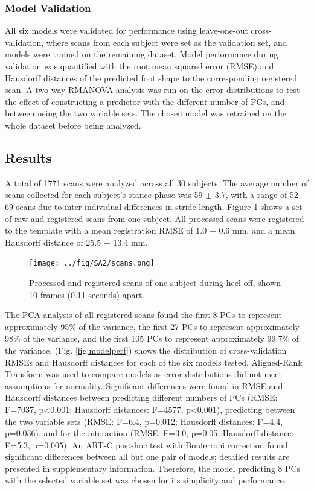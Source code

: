 \documentclass[defaultstyle,11pt]{comps}
\begin{document}
\hypertarget{model-validation}{%
\subsubsection{Model Validation}\label{model-validation}}

All six models were validated for performance using leave-one-out cross-validation, where scans from each subject were set as the validation set, and models were trained on the remaining dataset.
Model performance during validation was quantified with the root mean squared error (RMSE) and Hausdorff distances of the predicted foot shape to the corresponding registered scan.
A two-way RMANOVA analysis was run on the error distributions to test the effect of constructing a predictor with the different number of PCs, and between using the two variable sets.
The chosen model was retrained on the whole dataset before being analyzed.

\hypertarget{results-1}{%
\subsection{Results}\label{results-1}}

A total of 1771 scans were analyzed across all 30 subjects.
The average number of scans collected for each subject's stance phase was 59 \(\pm\) 3.7, with a range of 52-69 scans due to inter-individual differences in stride length.
Figure \ref{fig:scans} shows a set of raw and registered scans from one subject.
All processed scans were registered to the template with a mean registration RMSE of 1.0 \(\pm\) 0.6 mm, and a mean Hausdorff distance of 25.5 \(\pm\) 13.4 mm.

\begin{figure}
\hypertarget{fig:scans}{%
\centering
\texttt{[image: ../fig/SA2/scans.png]}
\caption{Processed and registered scans of one subject during heel-off, shown 10 frames (0.11 seconds) apart.}\label{fig:scans}
}
\end{figure}

The PCA analysis of all registered scans found the first 8 PCs to represent approximately 95\% of the variance, the first 27 PCs to represent approximately 98\% of the variance, and the first 105 PCs to represent approximately 99.7\% of the variance.
(Fig. \ref{fig:modelperf}) shows the distribution of cross-validation RMSEs and Hausdorff distances for each of the six models tested.
Aligned-Rank Transform \citep{Wobbrock2011} was used to compare models as error distributions did not meet assumptions for normality.
Significant differences were found in RMSE and Hausdorff distances between predicting different numbers of PCs (RMSE: F=7037, p\textless0.001; Hausdorff distances: F=4577, p\textless0.001), predicting between the two variable sets (RMSE: F=6.4, p=0.012; Hausdorff distances: F=4.4, p=0.036), and for the interaction (RMSE: F=3.0, p=0.05; Hausdorff distance: F=5.3, p=0.005).
An ART-C post-hoc test \citep{Elkin2021} with Bonferroni correction found significant differences between all but one pair of models; detailed results are presented in supplementary information.
Therefore, the model predicting 8 PCs with the selected variable set was chosen for its simplicity and performance.
\end{document}
